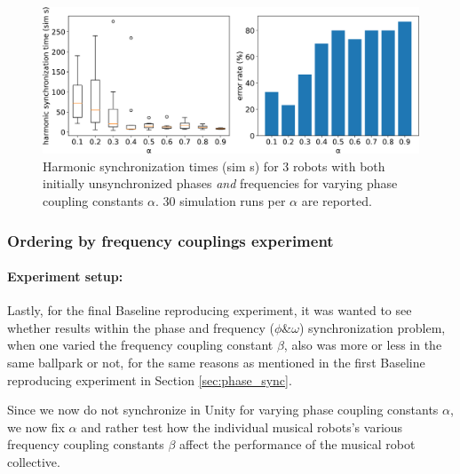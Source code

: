 			\begin{figure}[ht!]
				\centering
				\includegraphics[width=\linewidth]{Assets/DocSegments/Chapters/ExperimentsAndResults/Figures/PerfScores/stable_baseline_reproducing_phase_and_freq_sync_for_alpha.pdf}
				\caption[Experiment results for $\phi$ \& $\omega$ synchronization baseline reproduction and stabilization experiment.]{Harmonic synchronization times (sim s) for 3 robots with both initially unsynchronized phases \textit{and} frequencies for varying phase coupling constants $\alpha$. 30 simulation runs per $\alpha$ are reported.}
				\label{fig:stable_baseline_reproducing_phase_and_freq_sync_for_alpha}
			\end{figure}
			
			
	
		\subsubsection{Ordering by frequency couplings experiment}
		
		\paragraph{Experiment setup:\nl}
		
		Lastly, for the final Baseline reproducing experiment, it was wanted to see whether results within the phase and frequency ($\phi\&\omega$) synchronization problem, when one varied the frequency coupling constant $\beta$, also was more or less in the same ballpark or not, for the same reasons as mentioned in the first Baseline reproducing experiment in Section \ref{sec:phase_sync}.
		
		Since we now do not synchronize in Unity for varying phase coupling constants $\alpha$, we now fix $\alpha$ and rather test how the individual musical robots's various frequency coupling constants $\beta$ affect the performance of the musical robot collective.
		
